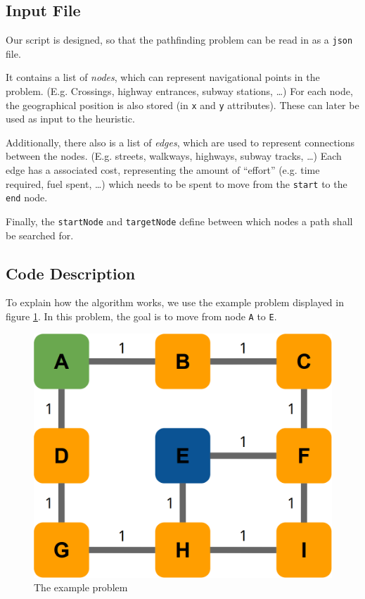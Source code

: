 \documentclass[12pt]{article}
\begin{document}
\subsection{Input File}
Our script is designed, so that the pathfinding problem can be read in as a \texttt{json} file.

It contains a list of \textit{nodes}, which can represent navigational points in the problem.
(E.g. Crossings, highway entrances, subway stations, \ldots)
For each node, the geographical position is also stored (in \texttt{x} and \texttt{y} attributes).
These can later be used as input to the heuristic.

Additionally, there also is a list of \textit{edges}, which are used to represent connections between the nodes.
(E.g. streets, walkways, highways, subway tracks, \ldots)
Each edge has a associated cost, representing the amount of \enquote{effort} (e.g. time required, fuel spent, \ldots) which needs to be spent to move from the \texttt{start} to the \texttt{end} node.

Finally, the \texttt{startNode} and \texttt{targetNode} define between which nodes a path shall be searched for.


\subsection{Code Description}
To explain how the algorithm works, we use the example problem displayed in figure \ref{fig:ex1}.
In this problem, the goal is to move from node \texttt{A} to \texttt{E}.
\begin{figure}[H]
	\centering
	\includegraphics[width=0.7\linewidth]{sources/ex1}
	\caption{The example problem}
	\label{fig:ex1}
\end{figure}
\end{document}
